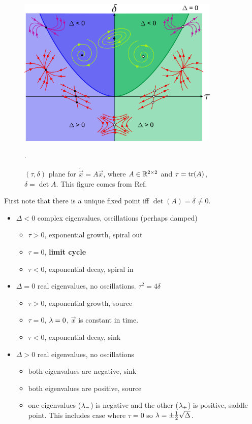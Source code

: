 \begin{figure}[h!]
\centering
\includegraphics[width=3.8in]
{phase-plane/Phase_plane_nodes.png}
\caption{
$(\tau, \delta)$ plane
for $\dot{\vec{x}} = A \vec{x}$, where $A\in  { \mathbb{R}}^{2\times 2}$ and  $\tau={\rm tr }(A)$, $\delta=\det{A}$. This
figure  comes from Ref.\cite{wiki-phase-plane}}.
\label{fig-wiki-pp}
\end{figure}

First note that there is a unique fixed point iff 
$\det(A)=\delta\neq 0$.

\begin{itemize}
\item $\Delta < 0$
complex eigenvalues,
oscillations (perhaps damped)
\begin{itemize}[\checkmark]
\item $\tau>0$, exponential growth, spiral out
\item $\tau=0$, {\bf limit cycle}
\item $\tau<0$, exponential decay, spiral in
\end{itemize}


\item $\Delta = 0$
real eigenvalues,
no oscillations. $\tau^2 = 4\delta$
\begin{itemize}[\checkmark]
\item $\tau>0$, exponential growth, source
\item $\tau=0$, $\lambda=0$, $\vec{x}$ is constant in time.
\item $\tau<0$, exponential decay, sink
\end{itemize}

\item $\Delta > 0$
real eigenvalues,
no oscillations 

\begin{itemize}[\checkmark]
\item both eigenvalues are negative, sink
\item both eigenvalues are positive, source
\item one eigenvalues ($\lambda_-$) is negative 
and the other ($\lambda_+$) is positive, saddle point. This 
includes case where $\tau=0$ so $\lambda =\pm\frac{1}{2}\sqrt{\Delta}$.
\end{itemize}
\end{itemize}

